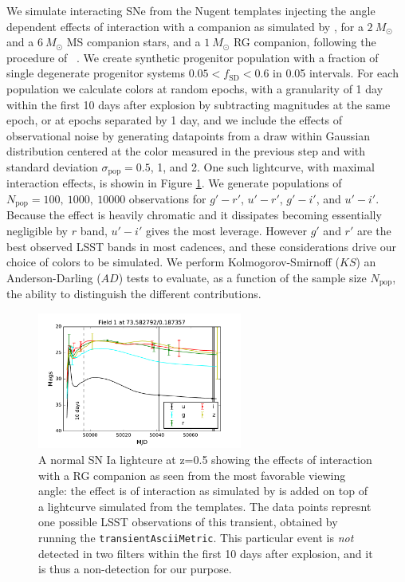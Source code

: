 We simulate interacting SNe from the Nugent templates \citep{Nugent02}
injecting the angle dependent effects of interaction with a companion
as simulated by \citep{Kasen10}, for a $2~M_\odot$ and a $6~M_\odot$
MS companion stars, and a $1~M_\odot$ RG companion, following the
procedure of ~\citep{Bianco11}. We create synthetic progenitor
population with a fraction of single degenerate progenitor systems
$0.05 < f_\mathrm{SD} < 0.6 $ in 0.05 intervals. For each population
we calculate colors at random epochs, with a granularity of 1 day
within the first 10 days after explosion by subtracting magnitudes at
the same epoch, or at epochs separated by 1 day, and we include the
effects of observational noise by generating datapoints from a draw
within Gaussian distribution centered at the color measured in the
previous step and with standard deviation $\sigma_\mathrm{pop} = 0.5$,
1, and 2. One such lightcurve, with maximal interaction effects, is showin in Figure \ref{fig:kasenlc}.
We generate populations of $N_\mathrm{pop}=100,
~1000,~10000$ observations for $g'-r'$, $u'-r'$, $g'-i'$, and
$u'-i'$. Because the effect is heavily chromatic and it dissipates
becoming essentially negligible by $r$ band, $u'-i'$ gives the most
leverage. However $g'$ and $r'$ are the best observed LSST bands in
most cadences, and these considerations drive our choice of colors to
be simulated. We perform Kolmogorov-Smirnoff ($KS$) an
Anderson-Darling ($AD$) tests to evaluate, as a function of the sample
size $N_\mathrm{pop}$, the ability to distinguish the different
contributions.

\begin{figure}[hbt]
\centerline{
\includegraphics[width=0.6\textwidth]{figs/transients/LSST_Kasen_lcv0.pdf}
}
\caption{
A normal SN Ia lightcure at z=0.5 showing the effects of interaction with a RG companion as seen from the most favorable viewing angle: the effect is of interaction as simulated by \citet{Kasen10} is added on top of a lightcurve simulated from the \citealt{Nugent02} templates. The data points represnt one possible LSST observations of this transient, obtained by running the \texttt{transientAsciiMetric}. This particular event is \emph{not} detected in two filters within the first 10 days after explosion, and it is thus a non-detection for our purpose.}
\label{fig:kasenlc}
\end{figure}



